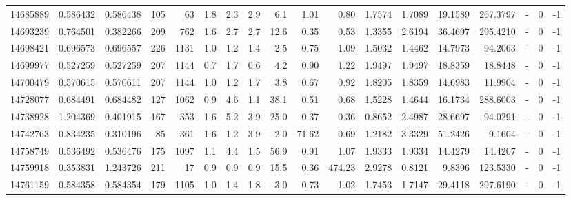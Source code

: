 \begin{tabular}{rrrrrrrrrrrrrrrlrr}
  14685889 & 0.586432 &   0.586438 &  105 &   63 &      1.8 &      2.3 &     2.9 &      6.1 &       1.01 &        0.80 &  1.7574 &  1.7089 &   19.1589 &  267.3797 &             - &        0 &         -1 \\
  14693239 & 0.764501 &   0.382266 &  209 &  762 &      1.6 &      2.7 &     2.7 &     12.6 &       0.35 &        0.53 &  1.3355 &  2.6194 &   36.4697 &  295.4210 &             - &        0 &         -1 \\
  14698421 & 0.696573 &   0.696557 &  226 & 1131 &      1.0 &      1.2 &     1.4 &      2.5 &       0.75 &        1.09 &  1.5032 &  1.4462 &   14.7973 &   94.2063 &             - &        0 &         -1 \\
  14699977 & 0.527259 &   0.527259 &  207 & 1144 &      0.7 &      1.7 &     0.6 &      4.2 &       0.90 &        1.22 &  1.9497 &  1.9497 &   18.8359 &   18.8448 &             - &        0 &         -1 \\
  14700479 & 0.570615 &   0.570611 &  207 & 1144 &      1.0 &      1.2 &     1.7 &      3.8 &       0.67 &        0.92 &  1.8205 &  1.8359 &   14.6983 &   11.9904 &             - &        0 &         -1 \\
  14728077 & 0.684491 &   0.684482 &  127 & 1062 &      0.9 &      4.6 &     1.1 &     38.1 &       0.51 &        0.68 &  1.5228 &  1.4644 &   16.1734 &  288.6003 &             - &        0 &         -1 \\
  14738928 & 1.204369 &   0.401915 &  167 &  353 &      1.6 &      5.2 &     3.9 &     25.0 &       0.37 &        0.36 &  0.8652 &  2.4987 &   28.6697 &   94.0291 &             - &        0 &         -1 \\
  14742763 & 0.834235 &   0.310196 &   85 &  361 &      1.6 &      1.2 &     3.9 &      2.0 &      71.62 &        0.69 &  1.2182 &  3.3329 &   51.2426 &    9.1604 &             - &        0 &         -1 \\
  14758749 & 0.536492 &   0.536476 &  175 & 1097 &      1.1 &      4.4 &     1.5 &     56.9 &       0.91 &        1.07 &  1.9333 &  1.9334 &   14.4279 &   14.4207 &             - &        0 &         -1 \\
  14759918 & 0.353831 &   1.243726 &  211 &   17 &      0.9 &      0.9 &     0.9 &     15.5 &       0.36 &      474.23 &  2.9278 &  0.8121 &    9.8396 &  123.5330 &             - &        0 &         -1 \\
  14761159 & 0.584358 &   0.584354 &  179 & 1105 &      1.0 &      1.4 &     1.8 &      3.0 &       0.73 &        1.02 &  1.7453 &  1.7147 &   29.4118 &  297.6190 &             - &        0 &         -1 \\

\end{tabular}
